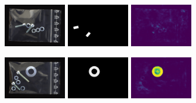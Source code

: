 \begin{figure}[H]
    \begin{subfigure}[b]{\textwidth}
        \centering
        \begin{minipage}{0.45\textwidth}
            \centering
            \includegraphics[width=0.3\textwidth]{figures/appendix/appendix_DRAEM/SB/144.png}
            \includegraphics[width=0.3\textwidth]{figures/appendix/appendix_DRAEM/SB/144m.png}
            \includegraphics[width=0.3\textwidth]{figures/appendix/appendix_DRAEM/SB/144_mask.png}
        \end{minipage}
        \begin{minipage}{0.45\textwidth}
            \centering
            \includegraphics[width=0.3\textwidth]{figures/appendix/appendix_DRAEM/SB/337.png}
            \includegraphics[width=0.3\textwidth]{figures/appendix/appendix_DRAEM/SB/337_m.png}
            \includegraphics[width=0.3\textwidth]{figures/appendix/appendix_DRAEM/SB/337_mask.png}
        \end{minipage}
    \end{subfigure}


\end{figure}
